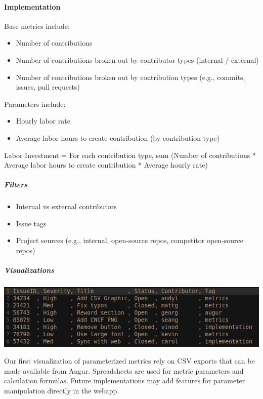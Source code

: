 \hypertarget{implementation}{%
\paragraph{Implementation}\label{implementation}}

Base metrics include:

\begin{itemize}
\tightlist
\item
  Number of contributions
\item
  Number of contributions broken out by contributor types (internal /
  external)
\item
  Number of contributions broken out by contribution types (e.g.,
  commits, issues, pull requests)
\end{itemize}

Parameters include:

\begin{itemize}
\tightlist
\item
  Hourly labor rate
\item
  Average labor hours to create contribution (by contribution type)
\end{itemize}

Labor Investment = For each contribution type, sum (Number of
contributions * Average labor hours to create contribution * Average
hourly rate)

\hypertarget{filters}{%
\subparagraph{Filters}\label{filters}}

\begin{itemize}
\tightlist
\item
  Internal vs external contributors
\item
  Issue tags
\item
  Project sources (e.g., internal, open-source repos, competitor
  open-source repos)
\end{itemize}

\hypertarget{visualizations}{%
\subparagraph{Visualizations}\label{visualizations}}

\includegraphics{images/labor-investment_csv.png}

Our first visualization of parameterized metrics rely on CSV exports
that can be made available from Augur. Spreadsheets are used for metric
parameters and calculation formulas. Future implementations may add
features for parameter manipulation directly in the webapp.


